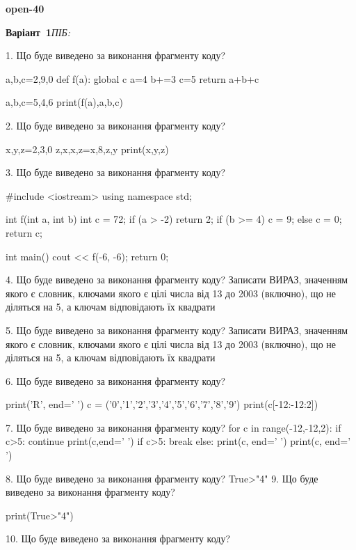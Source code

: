 \documentclass[11pt]{article}
\begin{document}
{\large\textbf{open-40}}

\textbf{Варіант \No\,1}\hfill \textit{ПІБ:}\,\underline{\hspace{60mm}}
\vspace{4mm}

1. Що буде виведено за виконання фрагменту коду?

a,b,c=2,9,0
def f(a):
global c    a=4
    b+=3
    c=5
    return a+b+c

a,b,c=5,4,6
print(f(a),a,b,c)

2. Що буде виведено за виконання фрагменту коду?

x,y,z=2,3,0
z,x,x,z=x,8,z,y
print(x,y,z)

3. Що буде виведено за виконання фрагменту коду?

#include <iostream>
using namespace std;

int f(int a, int b){
    int c = 72;
    if (a > -2)
        return 2;
    if (b >= 4)
         c = 9;
    else 
        c = 0;
    return c;
}

int main(){
    cout << f(-6, -6);
    return 0;
}

4. Що буде виведено за виконання фрагменту коду?
Записати ВИРАЗ, значенням якого є словник, ключами якого є цілі числа від 13 до 2003 (включно), що не діляться на 5, а ключам відповідають їх квадрати 

5. Що буде виведено за виконання фрагменту коду?
Записати ВИРАЗ, значенням якого є словник, ключами якого є цілі числа від 13 до 2003 (включно), що не діляться на 5, а ключам відповідають їх квадрати 

6. Що буде виведено за виконання фрагменту коду?

print('R', end=' ')
c = ('0','1','2','3','4','5','6','7','8','9')
print(c[-12:-12:2])


7. Що буде виведено за виконання фрагменту коду?
for c in range(-12,-12,2):
    if c>5:
        continue
        print(c,end=' ')
    if c>5:
        break
else:
    print(c, end=' ')
print(c, end=' ')

8. Що буде виведено за виконання фрагменту коду?
True>"4"
9. Що буде виведено за виконання фрагменту коду?

print(True>"4")

10. Що буде виведено за виконання фрагменту коду?
\end{document}
